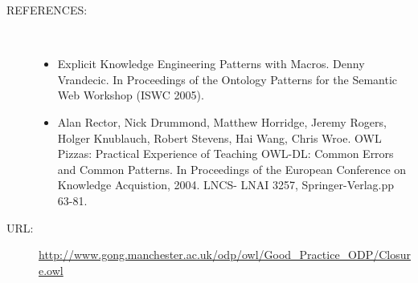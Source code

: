 \begin{description}
\item [REFERENCES: ] ~\begin{itemize}
\item Explicit Knowledge Engineering Patterns with Macros. Denny Vrandecic.
In Proceedings of the Ontology Patterns for the Semantic Web Workshop (ISWC 2005).
\item Alan Rector, Nick Drummond, Matthew Horridge, Jeremy Rogers, Holger Knublauch,  Robert Stevens, Hai Wang, Chris Wroe. OWL Pizzas: Practical Experience of Teaching OWL-DL: Common Errors and Common Patterns. In Proceedings of  the European Conference on Knowledge Acquistion, 2004. LNCS- LNAI 3257, Springer-Verlag.pp 63-81.\end{itemize}
\item [URL: ] \url{http://www.gong.manchester.ac.uk/odp/owl/Good_Practice_ODP/Closure.owl} \end{description}